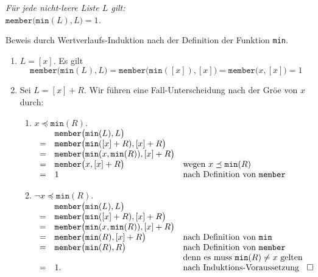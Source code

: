 \begin{Lemma} 
{\em
  F\"ur jede nicht-leere Liste $L$ gilt: \\[0.1cm]
  \hspace*{1.3cm} 
  $\mathtt{member}\bigl(\mathtt{min}(L), L\bigr) = 1$.
}
\end{Lemma}
Beweis durch Wertverlaufs-Induktion nach der Definition der Funktion \texttt{min}.
\begin{enumerate}
\item $L = [x]$.  Es gilt
      \[
        \mathtt{member}\bigl(\mathtt{min}(L), L\bigr)  = 
        \mathtt{member}\bigl(\mathtt{min}([x]), [x]\bigr) 
         =  \mathtt{member}\bigl(x, [x]\bigr) = 1
      \]
\item Sei $L = [x] + R$.  Wir f\"uhren eine Fall-Unterscheidung nach der Gr\"o\3e von $x$
      durch:
      \begin{enumerate}
      \item $x \preceq \mathtt{min}(R)$. \\[0.1cm]
        \hspace*{1.3cm} 
      $
      \begin{array}[b]{cll}
        & \mathtt{member}\bigl( \mathtt{min}(L), L \bigr) \\
      = & \mathtt{member}\bigl( \mathtt{min}([x]+R), [x] + R \bigr) \\
      = & \mathtt{member}\bigl( \mathtt{min}(x,\mathtt{min}(R)), [x] + R \bigr) \\
      = & \mathtt{member}\bigl( x, [x] + R \bigr) & 
          \mbox{wegen $x \preceq \mathtt{min}(R)$} \\
      = & 1 & 
          \mbox{nach Definition von \texttt{member}} \\
      \end{array}
      $
      \item $\neg x \preceq \mathtt{min}(R)$. \\[0.1cm]
        \hspace*{1.3cm} 
      $
      \begin{array}[b]{cll}
        & \mathtt{member}\bigl( \mathtt{min}(L), L \bigr) \\
      = & \mathtt{member}\bigl( \mathtt{min}([x]+R), [x] + R \bigr) \\
      = & \mathtt{member}\bigl( \mathtt{min}(x,\mathtt{min}(R)), [x] + R \bigr) \\
      = & \mathtt{member}\bigl( \mathtt{min}(R), [x] + R \bigr) & 
          \mbox{nach Definition von \texttt{min}} \\
      = & \mathtt{member}\bigl( \mathtt{min}(R), R \bigr) & 
          \mbox{nach Definition von \texttt{member}} \\
        & & \mbox{denn es muss $\mathtt{min}(R) \not= x$ gelten} \\
      = & 1. & 
          \mbox{nach Induktions-Voraussetzung} 
      \end{array}\hspace*{\fill} \Box
      $
      \end{enumerate}
\end{enumerate}

